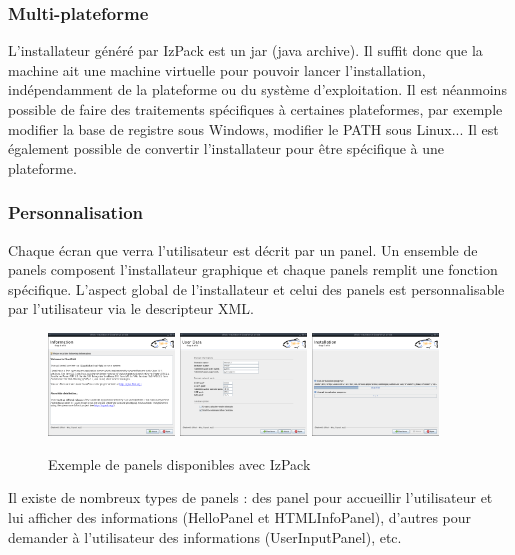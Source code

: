 \subsubsection{Multi-plateforme}
L'installateur généré par IzPack est un jar (java archive).
Il suffit donc que la machine ait une machine virtuelle pour pouvoir lancer l'installation, indépendamment de la plateforme ou du système d'exploitation.
Il est néanmoins possible de faire des traitements spécifiques à certaines plateformes, par exemple modifier la base de registre sous Windows, modifier le PATH sous Linux...
Il est également possible de convertir l'installateur pour être spécifique à une plateforme.

\subsubsection{Personnalisation}
Chaque écran que verra l'utilisateur est décrit par un panel.
Un ensemble de panels composent l'installateur graphique et chaque panels remplit une fonction spécifique.
L'aspect global de l'installateur et celui des panels est personnalisable par l'utilisateur via le descripteur XML.
\begin{figure}[H]
	\centering
	\includegraphics[width=0.3\textwidth]{../dia/included/install/02.png}
	\includegraphics[width=0.3\textwidth]{../dia/included/install/05.png}
	\includegraphics[width=0.3\textwidth]{../dia/included/install/06.png}
	\caption{Exemple de panels disponibles avec IzPack}
	\label{fig:panelGlass}
\end{figure}
Il existe de nombreux types de panels : des panel pour accueillir l'utilisateur et lui afficher des informations (HelloPanel et HTMLInfoPanel), d'autres pour demander à l'utilisateur des informations (UserInputPanel), etc.


